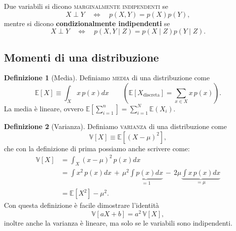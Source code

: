 \documentclass[10pt]{article}
\newcommand{\im}[1]{\textsc{#1}}
\newcommand{\cond}{\mid}
\newcommand{\pare}[1]{
	\ensuremath{\left(#1\right)}
}
\newcommand{\spare}[1]{
	\ensuremath{\left[#1\right]}
}
\theoremstyle{definition}
\newtheorem{definition}{Definizione}[section]
\begin{document}
Due variabili si dicono \im{marginalmente indipendenti} se
\begin{equation}
X\perp Y \quad\Longleftrightarrow\quad p\pare{X, Y} = p\pare{X} p\pare{Y},
\end{equation}
mentre si dicono \textbf{condizionalmente indipendenti} se
\begin{equation}
X\perp Y \quad\Longleftrightarrow\quad p\pare{X, Y\cond Z} = p\pare{X\cond Z} p\pare{Y\cond Z}. 
\end{equation}

\subsection{Momenti di una distribuzione}

\begin{definition}[Media] Definiamo \im{media} di una distribuzione come
\begin{equation}
\mathbb{E}\spare{X} \equiv \int_X x\, p\pare{x}dx \qquad\pare{ \mathbb{E}\spare{X_{\text{discreta}}} = \sum_{x\in X} x\, p\pare{x} }.
\end{equation}
La media è lineare, ovvero $\mathbb{E}\spare{\sum_{i=1}^n} = \sum_{i=1}^N \mathbb{E}\pare{X_i}$.
\end{definition}

\begin{definition}[Varianza] Definiamo \im{varianza} di una distribuzione come
\begin{equation}
\mathbb{V}\spare{X} \equiv \mathbb{E}\spare{\pare{X - \mu}^2},
\end{equation}
che con la definizione di prima possiamo anche scrivere come:
\begin{equation}
\begin{split}
\mathbb{V}\spare{X} &= \int_X \pare{x - \mu}^2\, p\pare{x}dx \\
&= \int x^2\, p\pare{x}dx \, +\, \mu^2\underbrace{\int p\pare{x}dx}_{=1} \, -\, 2\mu\underbrace{\int x\, p\pare{x}dx}_{=\mu} \\
&= \mathbb{E}\spare{X^2} - \mu^2.
\end{split}
\end{equation}
Con questa definizione è facile dimostrare l'identità
\begin{equation}
\mathbb{V}\spare{aX + b} = a^2\,\mathbb{V}\spare{X},
\end{equation}
inoltre anche la varianza è lineare, ma solo se le variabili sono indipendenti.
\end{definition}
\end{document}
